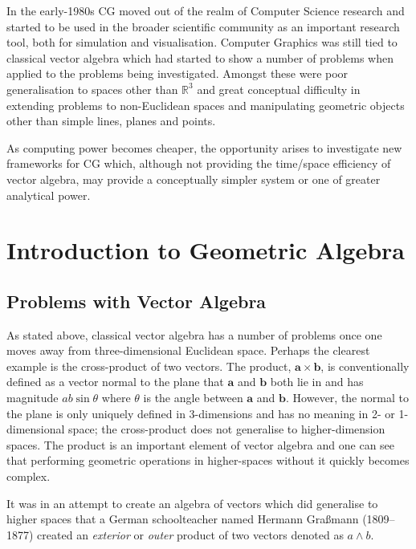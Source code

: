 In the early-1980s CG moved out of the realm of Computer
Science research and started to be used in the broader scientific 
community as an important research tool, both for simulation and visualisation.
Computer Graphics was still tied to classical vector algebra which
had started to show a number of problems when applied to the problems
being investigated. Amongst these were poor generalisation to
spaces other than $\mathbb{R}^3$ and great conceptual difficulty 
in extending problems to non-Euclidean spaces and
manipulating geometric objects other than simple lines, planes and points.

As computing power becomes cheaper, the opportunity
arises to investigate new
frameworks for CG which, although not providing the time/space
efficiency of vector algebra, may provide a conceptually simpler
system or one of greater analytical power.

\section{Introduction to Geometric Algebra}
\subsection{Problems with Vector Algebra}
As stated above, classical vector algebra has a number of problems
once one moves away from three-dimensional Euclidean space. Perhaps the
clearest example is the cross-product of two vectors.  The product, $\mathbf{a}
\times \mathbf{b}$, is conventionally defined as a vector normal to the plane
that $\mathbf{a}$ and $\mathbf{b}$ both lie in and has magnitude $ab\sin\theta$
where $\theta$ is the angle between $\mathbf{a}$ and $\mathbf{b}$. However, the
normal to the plane is only uniquely defined in 3-dimensions and has no meaning
in 2- or 1-dimensional space; the cross-product does not generalise to
higher-dimension spaces. The product is an important element of vector
algebra and one can see that performing geometric operations in higher-spaces
without it quickly becomes complex.

It was in an attempt \cite{grassmann} to create an algebra of vectors which 
did generalise
to higher spaces that a German schoolteacher named Hermann 
Gra{\ss}mann (1809--1877) created an \emph{exterior} 
or \emph{outer} product of two
vectors denoted as $a \wedge b$. 

